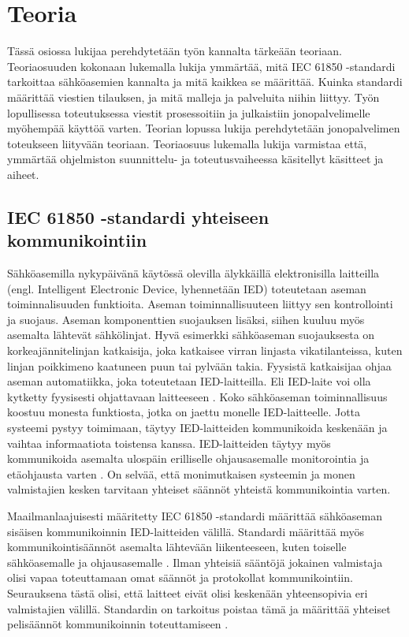 \chapter{Teoria}
\label{ch:teoria}
Tässä osiossa lukijaa perehdytetään työn kannalta tärkeään teoriaan. Teoriaosuuden kokonaan lukemalla lukija ymmärtää, mitä IEC 61850 -standardi tarkoittaa sähköasemien kannalta ja mitä kaikkea se määrittää. Kuinka standardi määrittää viestien tilauksen, ja mitä malleja ja palveluita niihin liittyy. Työn lopullisessa toteutuksessa viestit prosessoitiin ja julkaistiin jonopalvelimelle myöhempää käyttöä varten. Teorian lopussa lukija perehdytetään jonopalvelimen toteukseen liityvään teoriaan. Teoriaosuus lukemalla lukija varmistaa että, ymmärtää ohjelmiston suunnittelu- ja toteutusvaiheessa käsitellyt käsitteet ja aiheet.


\section{IEC 61850 -standardi yhteiseen kommunikointiin}
Sähköasemilla nykypäivänä käytössä olevilla älykkäillä elektronisilla laitteilla (engl. Intelligent Electronic Device, lyhennetään IED) toteutetaan aseman toiminnalisuuden funktioita. Aseman toiminnallisuuteen liittyy sen kontrollointi ja suojaus. Aseman komponenttien suojauksen lisäksi, siihen kuuluu myös asemalta lähtevät sähkölinjat. Hyvä esimerkki sähköaseman suojauksesta on korkeajännitelinjan katkaisija, joka katkaisee virran linjasta vikatilanteissa, kuten linjan poikkimeno kaatuneen puun tai pylvään takia. Fyysistä katkaisijaa ohjaa aseman automatiikka, joka toteutetaan IED-laitteilla. Eli IED-laite voi olla kytketty fyysisesti ohjattavaan laitteeseen \cite[s.~63--64]{IEC61850-7-1}. Koko sähköaseman toiminnallisuus koostuu monesta funktiosta, jotka on jaettu monelle IED-laitteelle. Jotta systeemi pystyy toimimaan, täytyy IED-laitteiden kommunikoida keskenään ja vaihtaa informaatiota toistensa kanssa. IED-laitteiden täytyy myös kommunikoida asemalta ulospäin erilliselle ohjausasemalle monitorointia ja etäohjausta varten \cite[s.~1]{Brunner2008}. On selvää, että monimutkaisen systeemin ja monen valmistajien kesken tarvitaan yhteiset säännöt yhteistä kommunikointia varten.

Maailmanlaajuisesti määritetty IEC 61850 -standardi määrittää sähköaseman sisäisen kommunikoinnin IED-laitteiden välillä. Standardi määrittää myös kommunikointisäännöt asemalta lähtevään liikenteeseen, kuten toiselle sähköasemalle ja ohjausasemalle \cite[s.~10]{IEC61850-7-1}. Ilman yhteisiä sääntöjä jokainen valmistaja olisi vapaa toteuttamaan omat säännöt ja protokollat kommunikointiin. Seurauksena tästä olisi, että laitteet eivät olisi keskenään yhteensopivia eri valmistajien välillä. Standardin on tarkoitus poistaa tämä ja määrittää yhteiset pelisäännöt kommunikoinnin toteuttamiseen \cite[s.~1]{Kaneda2008}.

